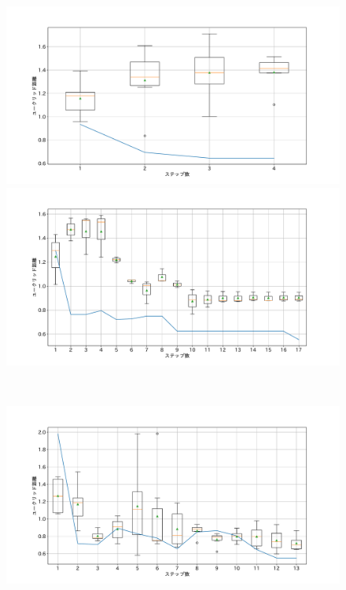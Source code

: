 \begin{figure}[h]
 \begin{minipage}[b]{0.48\linewidth}
  \centering
  \includegraphics[scale=0.15]{./imgs/gaChange/cake1_9.pdf}
 \end{minipage}
 \begin{minipage}[b]{0.48\linewidth}
  \centering
  \includegraphics[scale=0.15]{./imgs/gaChange/cake2_9.pdf}
 \end{minipage}\\
 \begin{minipage}[b]{0.48\linewidth}
  \centering
  \includegraphics[scale=0.15]{./imgs/gaChange/cake1_10.pdf}

\end{minipage}
\end{figure}
